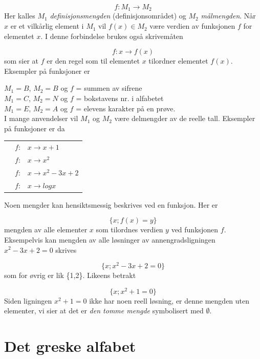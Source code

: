 \[       f : M_1\rightarrow M_2   \]
Her kalles $M_1$ {\em definisjonsmengden} (definisjonsområdet)
og $M_2$ {\em målmengden}.  Når $x$ er et vilkårlig element
i $M_1$ vil $f(x)\in M_2$ være verdien av funksjonen $f$ for
elementet $x$.  I denne forbindelse brukes også skrivemåten

\[          f: x\rightarrow f(x)  \]
som sier at $f$ er den regel som til elementet $x$ tilordner 
elementet $f(x)$.\\[0.5cm]

Eksempler på funksjoner er

\indent $M_1 = B$, $M_2 = B$ og $f$ = summen av sifrene  \\
\indent $M_1 = C$, $M_2 = N$ og $f$ = bokstavens nr. i alfabetet \\
\indent $M_1 = E$, $M_2 = A$ og $f$ = elevens karakter på en prøve.\\

I mange anvendelser vil $M_1$ og $M_2$ være delmengder av de reelle
tall.  Eksempler på funksjoner er da 
\begin{center}
\begin{tabular}{crl}
        &  $f$: & $x\rightarrow x+1$ \\
        &  $f$: & $x\rightarrow x^2$ \\
        &  $f$: & $x\rightarrow x^2 - 3x+2$ \\
        &  $f$: & $x\rightarrow logx $
\end{tabular}
\end{center}
Noen mengder kan hensiktsmessig beskrives ved en funksjon.  Her er 

\[      \{x; f(x) = y \} \]
mengden av alle elementer $x$ som tilordnes verdien $y$ ved 
funksjonen $f$.  Eksempelvis kan mengden av alle løsninger av
annengradsligningen \\ $x^2 - 3x + 2 = 0$ skrives

\[        \{x; x^2 - 3x + 2 = 0\}  \]
som for øvrig er lik \{1,2\}.  Likeens betrakt

\[     \{x; x^2 + 1 = 0\} \]
Siden ligningen $x^2 + 1 = 0$ ikke har noen reell løsning, er denne
mengden uten elementer, vi sier at det er {\em den tomme mengde}
symbolisert med $\emptyset$.



\section{Det greske alfabet}

